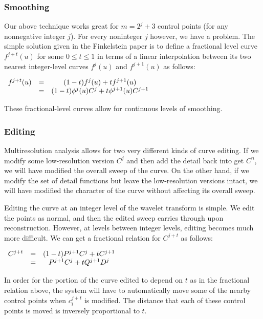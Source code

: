\documentclass[11pt]{article}
\begin{document}
\subsubsection{Smoothing}
\label{sec:smoothing}
Our above technique works great for $m = 2^{j}+3$ control points (for any nonnegative integer $j$). For every noninteger $j$ however, we have a problem. The simple solution given in the Finkelstein paper is to define a fractional level curve $f^{j+t}(u)$ for some $0 \leq t \leq 1$ in terms of a linear interpolation between its two nearest integer-level curves $f^{j}(u)$  and $f^{j+1}(u)$ as follows:
\begin{center}
$\begin{array}{c c c}
f^{j+t}(u) & = & (1-t) f^{j}(u) + t f^{j+1}(u)\\
               & = & (1-t) \phi^{j}(u) C^{j} + t \phi^{j+1}(u) C^{j+1}\\
\end{array}$
\end{center}
These fractional-level curves allow for continuous levels of smoothing.

\subsubsection{Editing}
\label{sec:editing}
Multiresolution analysis allows for two very different kinds of curve editing. If we modify some low-resolution version $C^{j}$ and then add the detail back into get $C^{n}$, we will have modified the overall sweep of the curve. On the other hand, if we modify the set of detail functions but leave the low-resolution versions intact, we will have modified the character of the curve without affecting its overall sweep.

Editing the curve at an integer level of the wavelet transform is simple. We edit the points as normal, and then the edited sweep carries through upon reconstruction. However, at levels between integer levels, editing becomes much more difficult. We can get a fractional relation for $C^{j+t}$ as follows:
\begin{center}
$\begin{array}{c c c}
C^{j+t} & = & (1-t) P^{j+1} C^{j} + t C^{j+1}\\
            & = & P^{j+1} C^{j} + t Q^{j+1} D^{j}\\
\end{array}$
\end{center}
In order for the portion of the curve edited to depend on $t$ as in the fractional relation above, the system will have to automatically move some of the nearby control points when $c^{j+t}_{i}$ is modified. The distance that each of these control points is moved is inversely proportional to $t$.
\end{document}
